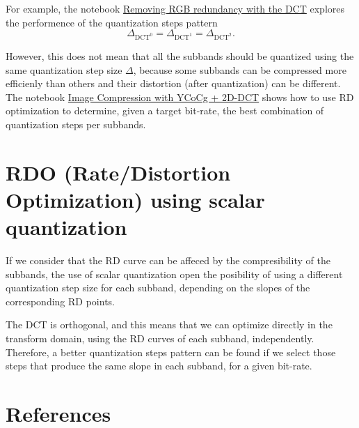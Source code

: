 For example, the notebook
\href{https://github.com/vicente-gonzalez-ruiz/color_transforms/blob/main/docs/3DCT/notebooks/3DCT_over_RGB.ipynb}{Removing
  RGB redundancy with the DCT} explores the performence of the
quantization steps pattern
\begin{equation}
  \Delta_{\text{DCT}^0} = \Delta_{\text{DCT}^1} = \Delta_{\text{DCT}^2}.
\end{equation}

However, this does not mean that all the subbands
should be quantized using the same quantization step size $\Delta$,
because some subbands can be compressed more efficienly than others
and their distortion (after quantization) can be different. The
notebook
\href{https://github.com/vicente-gonzalez-ruiz/DCT/blob/master/docs/notebooks/YCoCg_2D_DCT_SQ.ipynb}{Image
  Compression with YCoCg + 2D-DCT} shows how to use RD optimization to
determine, given a target bit-rate, the best combination of
quantization steps per subbands.

\section{RDO (Rate/Distortion Optimization) using scalar quantization}

If we consider that the RD curve can be affeced by the compresibility
of the subbands, the use of scalar quantization open the posibility of using a
different quantization step size for each subband, depending on the
slopes of the corresponding RD points.

The DCT is orthogonal, and this means that we can optimize directly in
the transform domain, using the RD curves of each subband,
independently. Therefore, a better quantization steps pattern can be
found if we select those steps that produce the same slope in each
subband, for a given bit-rate.

\section{References}

\renewcommand{\addcontentsline}[3]{}%

